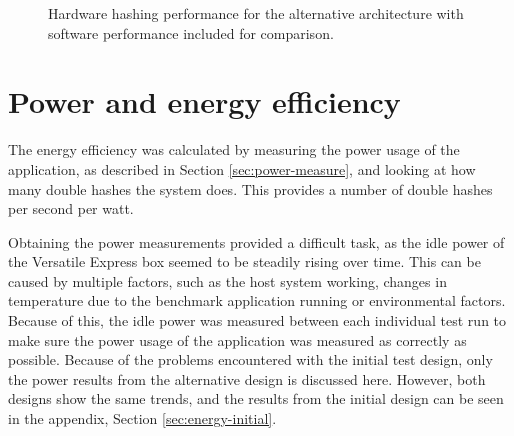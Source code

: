 \begin{figure}
	\centering
	\caption{Hardware hashing performance for the alternative architecture with software performance included for comparison.}
	\label{fig:shadmacomp-scaling2}
\end{figure}

\section{Power and energy efficiency}

The energy efficiency was calculated by measuring the power usage of the application, as described in Section \ref{sec:power-measure},
and looking at how many double hashes the system does. This provides a number of double hashes per second per watt.

Obtaining the power measurements provided a difficult task, as the idle power of the Versatile Express box seemed to be
steadily rising over time. This can be caused by multiple factors, such as the host system working, changes in temperature
due to the benchmark application running or environmental factors. Because of this, the idle power was measured between
each individual test run to make sure the power usage of the application was measured as correctly as possible.
Because of the problems encountered with the initial test design, only the power results from the alternative design
is discussed here. However, both designs show the same trends, and the results from the initial design can be seen in
the appendix, Section \ref{sec:energy-initial}.

